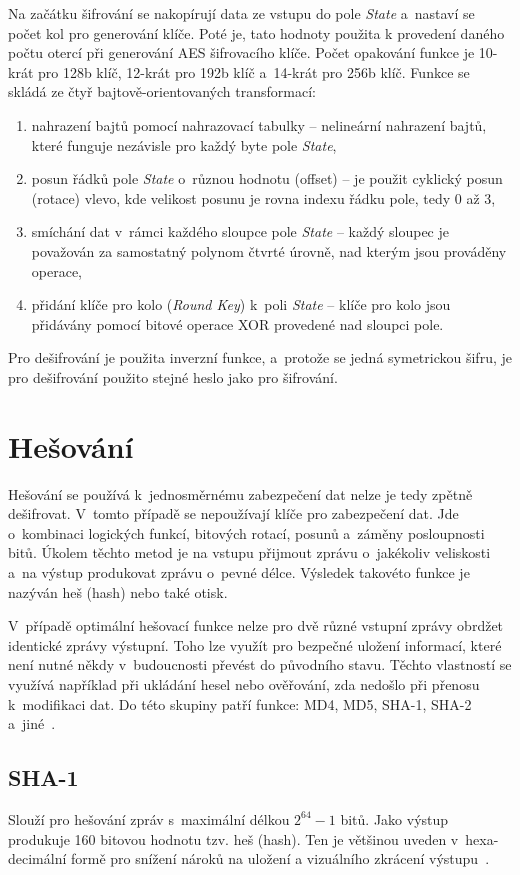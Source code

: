 Na začátku šifrování se nakopírují data ze vstupu do pole {\it State} a~nastaví se počet kol pro
generování klíče. Poté je, tato hodnoty použita k provedení daného počtu otercí při generování AES
šifrovacího klíče. Počet opakování funkce je 10-krát pro 128b klíč, 12-krát pro 192b klíč a~14-krát
pro 256b klíč. Funkce se skládá ze čtyř bajtově-orientovaných transformací:
    \begin{enumerate}
    \item nahrazení bajtů pomocí nahrazovací tabulky -- nelineární nahrazení bajtů, které funguje
        nezávisle pro každý byte pole {\it State},
    \item posun řádků pole {\it State} o~různou hodnotu (offset) -- je použit cyklický posun
        (rotace) vlevo, kde velikost posunu je rovna indexu řádku pole, tedy 0 až 3,
    \item smíchání dat v~rámci každého sloupce pole {\it State} -- každý sloupec je považován za
        samostatný polynom čtvrté úrovně, nad kterým jsou prováděny operace,
    \item přidání klíče pro kolo ({\it Round Key}) k~poli {\it State} -- klíče pro kolo jsou
	přidávány pomocí bitové operace XOR provedené nad sloupci pole.
\end{enumerate}
Pro dešifrování je použita inverzní funkce, a~protože se jedná symetrickou šifru, je pro dešifrování
použito stejné heslo jako pro šifrování.

\section{Hešování}
Hešování se používá k~jednosměrnému zabezpečení dat nelze je tedy zpětně dešifrovat. V~tomto případě
se nepoužívají klíče pro zabezpečení dat. Jde o~kombinaci logických funkcí, bitových rotací, posunů
a~záměny posloupnosti bitů. Úkolem těchto metod je na vstupu přijmout zprávu o~jakékoliv veliskosti
a~na výstup produkovat zprávu o~pevné délce. Výsledek takovéto funkce je nazýván heš (hash) nebo
také otisk. 

 V~případě optimální hešovací funkce nelze pro dvě různé vstupní zprávy obrdžet identické zprávy
výstupní. Toho lze využít pro bezpečné uložení informací, které není nutné někdy v~budoucnosti
převést do původního stavu. Těchto vlastností se využívá například při ukládání hesel nebo
ověřování, zda nedošlo při přenosu k~modifikaci dat. Do této skupiny patří funkce: MD4, MD5, SHA-1,
SHA-2 a~jiné~\cite{AC:1996}.

\subsection{SHA-1}
Slouží pro hešování zpráv s~maximální délkou $2^{64}-1$ bitů. Jako výstup produkuje 160 bitovou
hodnotu tzv. heš (hash). Ten je většinou uveden v~hexa-decimální formě pro snížení nároků na uložení
a vizuálního zkrácení výstupu~\cite{NIST:2015}. 

